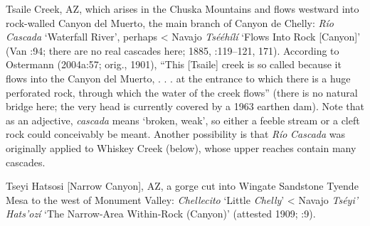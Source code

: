 Tsaile Creek, AZ, which arises in the Chuska Mountains and flows westward into rock-walled Canyon del Muerto, the main branch of Canyon de Chelly:  \textit{Río} \textit{Cascada} ‘Waterfall River’, perhaps < Navajo \textit{Tsééhílí} ‘Flows Into Rock [Canyon]’ (Van \citealt{ValkenburghWalker1945}:94; there are no real cascades here; 1885, \citealt{Jett2001}:119–121, 171).  According to Ostermann (2004a:57; orig., 1901), “This [Tsaile] creek is so called because it flows into the Canyon del Muerto, . . . at the entrance to which there is a huge perforated rock, through which the water of the creek flows” (there is no natural bridge here; the very head is currently covered by a 1963 earthen dam).  Note that as an adjective, \textit{cascada} means ‘broken, weak’, so either a feeble stream or a cleft rock could conceivably be meant.  Another possibility is that \textit{Río} \textit{Cascada} was originally applied to Whiskey Creek (below), whose upper reaches contain many cascades.

Tseyi Hatsosi [Narrow Canyon], AZ, a gorge cut into Wingate Sandstone Tyende Mesa to the west of Monument Valley: \textit{Chellecito} ‘Little \textit{Chelly}’ < Navajo \textit{Tséyi’} \textit{Hats’ozí} ‘The Narrow-Area Within-Rock (Canyon)’ (attested 1909; \citealt{Cummings1910}:9).

